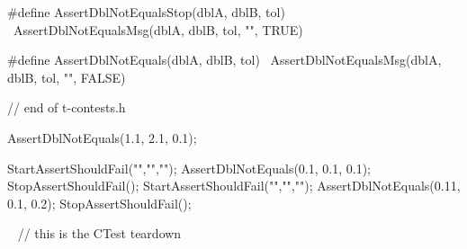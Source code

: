 #define AssertDblNotEqualsStop(dblA, dblB, tol) \
  AssertDblNotEqualsMsg(dblA, dblB, tol, "", TRUE)

#define AssertDblNotEquals(dblA, dblB, tol)    \
  AssertDblNotEqualsMsg(dblA, dblB, tol, "", FALSE)

// end of t-contests.h
\stopCHeader

\startCTest
AssertDblNotEquals(1.1, 2.1, 0.1);
\stopCTest
\stopTestCase

\startCTest
StartAssertShouldFail("","","");
  AssertDblNotEquals(0.1, 0.1, 0.1);
StopAssertShouldFail();
StartAssertShouldFail("","","");
  AssertDblNotEquals(0.11, 0.1, 0.2);
StopAssertShouldFail();
\stopCTest
\stopTestCase

\stopTestSuite

\CTestsTeardown\
\startCTest
  // this is the CTest teardown
\stopCTest
